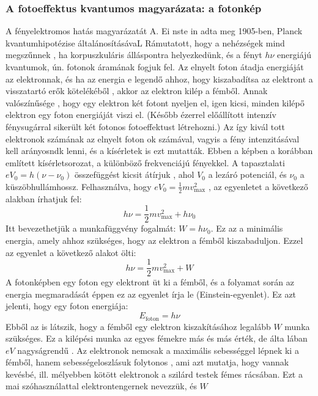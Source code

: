 \documentclass[a4paper,12pt]{article}
\begin{document}
\subsubsection{A fotoeffektus kvantumos magyarázata: a fotonkép}
A fényelektromos hatás magyarázatát A. Ei nste in adta meg 1905-ben, Planck kvantumhipotézise általánosításávaL Rámutatott, hogy a nehézségek mind megszűnnek , ha korpuszkuláris álláspontra helyezkedünk, és a fényt
$h \nu$ energiájú kvantumok, ún. fotonok áramának fogjuk fel. Az elnyelt foton átadja energiáját az elektronnak, és ha az energia e legendő ahhoz, hogy kiszabadítsa az elektront a visszatartó erők kötelékéből , akkor az elektron
kilép a fémből. Annak valószínűsége , hogy egy elektron két fotont nyeljen el, igen kicsi, minden kilépő elektron egy foton energiáját viszi el. (Később ézerrel előállított intenzív fénysugárral sikerült két fotonos fotoeffektust
létrehozni.) Az így kivál tott elektronok számának az elnyelt foton ok számával, vagyis a fény intenzitásával kell arányosndk lenni, és a kísérletek is ezt mutatták. Ebben a képben a korábban említett kísérletsorozat, a különböző
frekvenciájú fényekkel. A tapasztalati $eV_0 = h(\nu - \nu_0)$ összefüggést kicsit átírjuk , ahol $V_0$ a lezáró potenciál, és $\nu_0$ a küszöbhullámhossz.
Felhasználva, hogy $eV_0 = \frac{1}{2} mv_{\text{max}}^2$ , az egyenletet a következő alakban írhatjuk fel:
\begin{equation}
    h \nu = \frac{1}{2} mv_{\text{max}}^2 + h \nu_0
\end{equation}
Itt bevezethetjük a munkafüggvény fogalmát: $W = h \nu_0$. Ez az a minimális energia, amely ahhoz szükséges, hogy az elektron a fémből kiszabaduljon. Ezzel az egyenlet a következő alakot ölti:
\begin{equation}
    h \nu = \frac{1}{2} mv_{\text{max}}^2 + W
\end{equation}
A fotonképben egy foton egy elektront üt ki a fémből, és a folyamat során az energia megmaradását éppen ez az egyenlet írja le (Einstein-egyenlet). Ez azt jelenti, hogy egy foton energiája:
\begin{equation}
    E_{\text{foton}} = h \nu
\end{equation}
Ebből az is látszik, hogy a fémből egy elektron kiszakításához legalább $W$ munka szükséges. Ez a kilépési munka az egyes fémekre más és más érték, de
álta lában $eV$ nagyságrendű . Az elektronok nemcsak a maximális sebességgel lépnek ki a fémből, hanem sebességeloszlásuk folytonos , ami azt mutatja,
hogy vannak kevésbé, ill. mélyebben kötött elektronok a szilárd testek fémes rácsában. Ezt a mai szóhasználattal elektrontengernek nevezzük, és $W$
\end{document}
